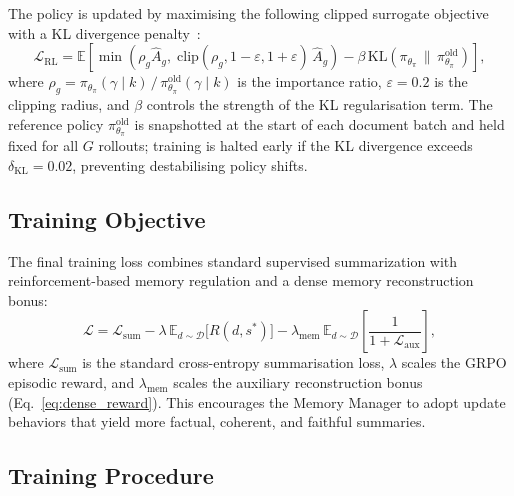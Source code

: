 \documentclass{article}
\begin{document}
The policy is updated by maximising the following clipped surrogate objective with a KL divergence penalty~\citep{schulman2017proximal}:
\begin{equation}
\label{eq:rl_obj}
\mathcal{L}_{\text{RL}} =
\mathbb{E}\!\left[
  \min\!\left(
    \rho_g \hat{A}_g,\;
    \mathrm{clip}(\rho_g, 1{-}\varepsilon, 1{+}\varepsilon)\,\hat{A}_g
  \right)
  - \beta\,\mathrm{KL}\!\left(\pi_{\theta_\pi} \,\|\, \pi_{\theta_\pi}^{\text{old}}\right)
\right],
\end{equation}
where $\rho_g = \pi_{\theta_\pi}(\gamma \mid k)\,/\,\pi_{\theta_\pi}^{\text{old}}(\gamma \mid k)$ is the importance ratio, $\varepsilon{=}0.2$ is the clipping radius, and $\beta$ controls the strength of the KL regularisation term.
The reference policy $\pi_{\theta_\pi}^{\text{old}}$ is snapshotted at the start of each document batch and held fixed for all $G$ rollouts; training is halted early if the KL divergence exceeds $\delta_{\mathrm{KL}}{=}0.02$, preventing destabilising policy shifts.

\subsection{Training Objective}

The final training loss combines standard supervised summarization with reinforcement-based memory regulation and a dense memory reconstruction bonus:
\begin{equation}
\label{eq:training_obj}
\mathcal{L} =
\mathcal{L}_{\text{sum}}
-
\lambda\,
\mathbb{E}_{d \sim \mathcal{D}}
\big[ R(d, s^*) \big]
-
\lambda_{\text{mem}}\,
\mathbb{E}_{d \sim \mathcal{D}}
\!\left[\frac{1}{1 + \mathcal{L}_{\text{aux}}}\right],
\end{equation}
where $\mathcal{L}_{\text{sum}}$ is the standard cross-entropy summarisation loss, $\lambda$ scales the GRPO episodic reward, and $\lambda_{\text{mem}}$ scales the auxiliary reconstruction bonus (Eq.~\ref{eq:dense_reward}).
This encourages the Memory Manager to adopt update behaviors that yield more factual, coherent, and faithful summaries.

\subsection{Training Procedure}
\end{document}

